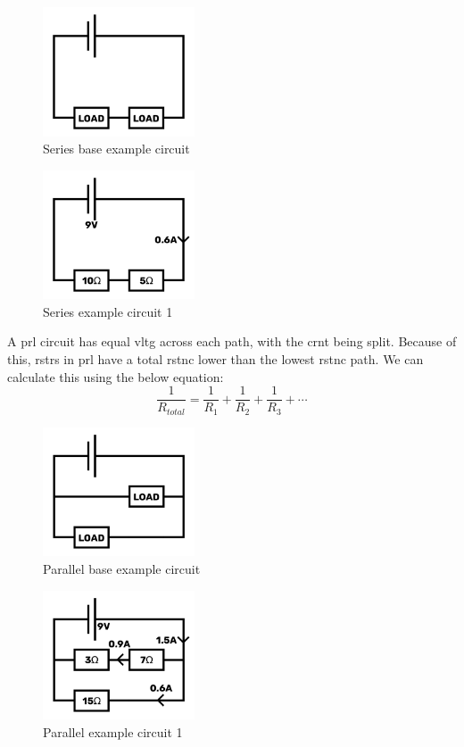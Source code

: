 \documentclass[a4paper,11pt]{report}
\begin{document}
\begin{figure}[H]
\centering
\includegraphics[width=0.4\textwidth]{series1}
\caption{Series base example circuit}
\end{figure}

\begin{figure}[H]
\centering
\includegraphics[width=0.4\textwidth]{series2}
\caption{Series example circuit 1}
\end{figure}

A \gls{prl} circuit has equal \gls{vltg} across each path, with the \gls{crnt} being split. Because of this, \gls{rstr}s in \gls{prl} have a total \gls{rstnc} lower than the lowest \gls{rstnc} path.
We can calculate this using the below equation:
\[\frac{1}{R_{total}} = \frac{1}{R_1} + \frac{1}{R_2} + \frac{1}{R_3} + \cdots\]

\begin{figure}[H]
\centering
\includegraphics[width=0.4\textwidth]{parallel1}
\caption{Parallel base example circuit}
\end{figure}

\begin{figure}[H]
\centering
\includegraphics[width=0.4\textwidth]{parallel2}
\caption{Parallel example circuit 1}
\end{figure}
\end{document}
